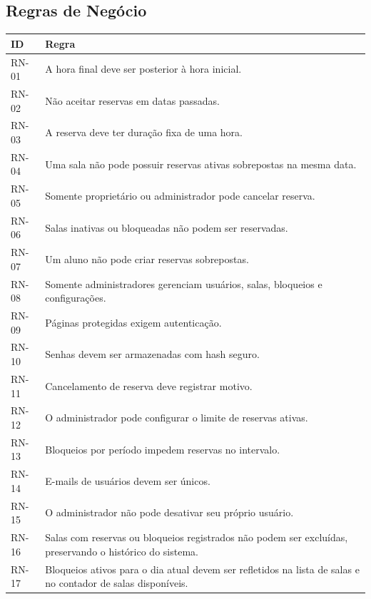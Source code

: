 \documentclass[12pt,a4paper]{article}
\begin{document}
\subsection{Regras de Negócio}
\begin{longtable}{|p{2cm}|p{12cm}|}
\hline
\textbf{ID} & \textbf{Regra} \\ \hline
RN-01 & A hora final deve ser posterior à hora inicial. \\ \hline
RN-02 & Não aceitar reservas em datas passadas. \\ \hline
RN-03 & A reserva deve ter duração fixa de uma hora. \\ \hline
RN-04 & Uma sala não pode possuir reservas ativas sobrepostas na mesma data. \\ \hline
RN-05 & Somente proprietário ou administrador pode cancelar reserva. \\ \hline
RN-06 & Salas inativas ou bloqueadas não podem ser reservadas. \\ \hline
RN-07 & Um aluno não pode criar reservas sobrepostas. \\ \hline
RN-08 & Somente administradores gerenciam usuários, salas, bloqueios e configurações. \\ \hline
RN-09 & Páginas protegidas exigem autenticação. \\ \hline
RN-10 & Senhas devem ser armazenadas com hash seguro. \\ \hline
RN-11 & Cancelamento de reserva deve registrar motivo. \\ \hline
RN-12 & O administrador pode configurar o limite de reservas ativas. \\ \hline
RN-13 & Bloqueios por período impedem reservas no intervalo. \\ \hline
RN-14 & E-mails de usuários devem ser únicos. \\ \hline
RN-15 & O administrador não pode desativar seu próprio usuário. \\ \hline
RN-16 & Salas com reservas ou bloqueios registrados não podem ser excluídas, preservando o histórico do sistema. \\ \hline
RN-17 & Bloqueios ativos para o dia atual devem ser refletidos na lista de salas e no contador de salas disponíveis. \\ \hline
\end{longtable}
\end{document}
